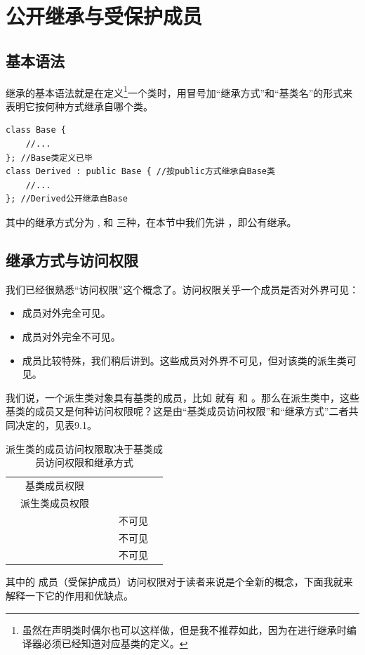 \section{公开继承与受保护成员}
\subsection*{基本语法}
继承的基本语法就是在定义\footnote{虽然在声明类时偶尔也可以这样做，但是我不推荐如此，因为在进行继承时编译器必须已经知道对应基类的定义。}一个类时，用冒号加``继承方式''和``基类名''的形式来表明它按何种方式继承自哪个类。
\begin{lstlisting}
class Base {
    //...
}; //Base类定义已毕
class Derived : public Base { //按public方式继承自Base类
    //...
}; //Derived公开继承自Base
\end{lstlisting}\par
其中的继承方式分为 \lstinline@public@, \lstinline@protected@ 和 \lstinline@private@ 三种，在本节中我们先讲 \lstinline@public@，即公有继承。\par
\subsection*{继承方式与访问权限}
我们已经很熟悉``访问权限''这个概念了。访问权限关乎一个成员是否对外界可见：
\begin{itemize}
    \item \lstinline@public@ 成员对外完全可见。
    \item \lstinline@private@ 成员对外完全不可见。
    \item \lstinline@protected@ 成员比较特殊，我们稍后讲到。这些成员对外界不可见，但对该类的派生类可见。
\end{itemize}
我们说，一个派生类对象具有基类的成员，比如 \lstinline@Husky@ 就有 \lstinline@age@ 和 \lstinline@weight@。那么在派生类中，这些基类的成员又是何种访问权限呢？这是由``基类成员访问权限''和``继承方式''二者共同决定的，见表9.1。\par
\begin{table}[htbp]
\centering
\begin{tabular}{cccccc}
\hline
\rule{0pt}{2.4ex}
\multirow{2}{*}{继承方式} & 基类成员权限 & \multirow{2}{*}{\lstinline@public@} & \multirow{2}{*}{\lstinline@protected@} & \multirow{2}{*}{\lstinline@private@} \\
\cline{2-2}
\rule{0pt}{2.4ex}
& 派生类成员权限 & & & \\
\hline
\hline
\rule{0pt}{2.4ex}
\lstinline@public@ & & \lstinline@public@ & \lstinline@protected@ & 不可见\\
\hline
\rule{0pt}{2.4ex}
\lstinline@protected@ & & \lstinline@protected@ & \lstinline@protected@ & 不可见\\
\hline
\rule{0pt}{2.4ex}
\lstinline@private@ & & \lstinline@private@ & \lstinline@private@ & 不可见\\
\hline
\end{tabular}
\caption{派生类的成员访问权限取决于基类成员访问权限和继承方式}
\end{table}
其中的 \lstinline@protected@ 成员（受保护成员）访问权限对于读者来说是个全新的概念，下面我就来解释一下它的作用和优缺点。\par
